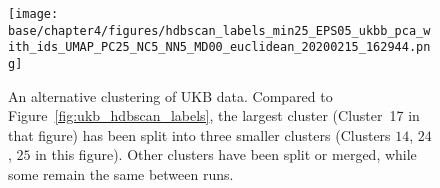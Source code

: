 \clearpage

\begin{figure}[!ht]
  \centering
    \texttt{[image: base/chapter4/figures/hdbscan\_labels\_min25\_EPS05\_ukbb\_pca\_with\_ids\_UMAP\_PC25\_NC5\_NN5\_MD00\_euclidean\_20200215\_162944.png]}
  \caption[Alternative clustering of the UKB]{An alternative clustering of UKB data. Compared to Figure~\ref{fig:ukb_hdbscan_labels}, the largest cluster (Cluster~17 in that figure) has been split into three smaller clusters (Clusters $14$, $24$, $25$ in this figure). Other clusters have been split or merged, while some remain the same between runs.}
  \label{fig:supp_ukb_alt}
\end{figure}

\clearpage

